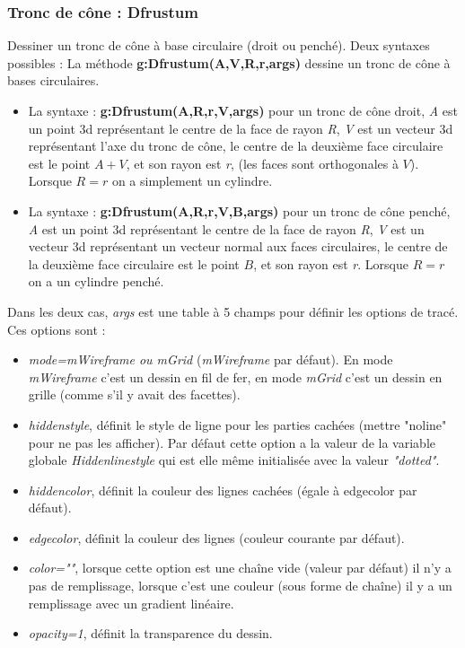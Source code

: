 \subsubsection{Tronc de cône : Dfrustum}

Dessiner un tronc de cône à base circulaire (droit ou penché). Deux syntaxes possibles :
La méthode \textbf{g:Dfrustum(A,V,R,r,args)} dessine un tronc de cône à bases circulaires.

\begin{itemize}
    \item La syntaxe : \textbf{g:Dfrustum(A,R,r,V,args)} pour un tronc de cône droit, \emph{A} est un point 3d représentant le centre de la face de rayon \emph{R}, \emph{V} est un vecteur 3d représentant l'axe du tronc de cône, le centre de la deuxième face circulaire est le point $A+V$, et son rayon est \emph{r},  (les faces sont orthogonales à $V$). Lorsque $R=r$ on a simplement un cylindre.
    \item La syntaxe : \textbf{g:Dfrustum(A,R,r,V,B,args)} pour un tronc de cône penché, \emph{A} est un point 3d représentant le centre de la face de rayon \emph{R}, \emph{V} est un vecteur 3d représentant un vecteur normal aux faces circulaires, le centre de la deuxième face circulaire est le point $B$, et son rayon est \emph{r}. Lorsque $R=r$ on a un cylindre penché.
\end{itemize}
Dans les deux cas, \emph{args} est une table à 5 champs pour définir les options de tracé. Ces options sont :
    \begin{itemize}
        \item \emph{mode=mWireframe ou mGrid} (\emph{mWireframe} par défaut). En mode \emph{mWireframe} c'est un dessin en fil de fer, en mode \emph{mGrid} c'est un dessin en grille (comme s'il y avait des facettes).
        \item \emph{hiddenstyle}, définit le style de ligne pour les parties cachées (mettre "noline" pour ne pas les afficher). Par défaut cette option a la valeur de la variable globale \emph{Hiddenlinestyle} qui est elle même initialisée avec la valeur \emph{"dotted"}.
        \item \emph{hiddencolor}, définit la couleur des lignes cachées (égale à edgecolor par défaut).
        \item \emph{edgecolor}, définit la couleur des lignes (couleur courante par défaut).
        \item \emph{color=""}, lorsque cette option est une chaîne vide (valeur par défaut) il n'y a pas de remplissage,  lorsque c'est une couleur (sous forme de chaîne) il y a un remplissage avec un gradient linéaire.
        \item \emph{opacity=1}, définit la transparence du dessin.
    \end{itemize}

